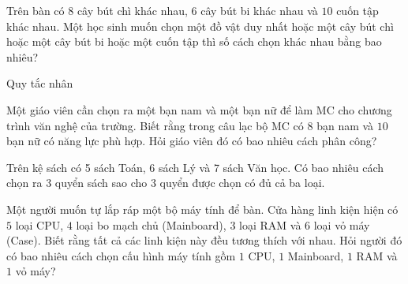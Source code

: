\begin{vd}%
	Trên bàn có $8$ cây bút chì khác nhau, $6$ cây bút bi khác nhau và $10$ cuốn tập khác nhau. Một học sinh muốn chọn một đồ vật duy nhất hoặc một cây bút chì hoặc một cây bút bi hoặc một cuốn tập thì số cách chọn khác nhau bằng bao nhiêu?
\end{vd} 

\begin{dang}{Quy tắc nhân}
\end{dang}

\begin{vd}
	Một giáo viên cần chọn ra một bạn nam và một bạn nữ để làm MC cho chương trình văn nghệ của trường. Biết rằng trong câu lạc bộ MC có $8$ bạn nam và $10$ bạn nữ có năng lực phù hợp. Hỏi giáo viên đó có bao nhiêu cách phân công?
\end{vd}
\begin{vd}
	Trên kệ sách có 5 sách Toán, 6 sách Lý và 7 sách Văn học. Có bao nhiêu cách chọn ra 3 quyển sách sao cho 3 quyển được chọn có đủ cả ba loại.
	\loigiai{
	}
\end{vd} 


\begin{vd}
	Một người muốn tự lắp ráp một bộ máy tính để bàn. Cửa hàng linh kiện hiện có $5$ loại CPU, $4$ loại bo mạch chủ (Mainboard), $3$ loại RAM và $6$ loại vỏ máy (Case). Biết rằng tất cả các linh kiện này đều tương thích với nhau. Hỏi người đó có bao nhiêu cách chọn cấu hình máy tính gồm $1$ CPU, $1$ Mainboard, $1$ RAM và $1$ vỏ máy?
\end{vd}


